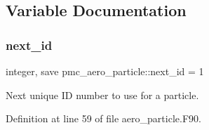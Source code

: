\subsection{Variable Documentation}
\mbox{\label{namespacepmc__aero__particle_aff614922ffabac9dab3634049c70a2a8}} 
\subsubsection{\texorpdfstring{next\+\_\+id}{next\_id}}
{\footnotesize\ttfamily integer, save pmc\+\_\+aero\+\_\+particle\+::next\+\_\+id = 1}



Next unique ID number to use for a particle. 



Definition at line 59 of file aero\+\_\+particle.\+F90.

